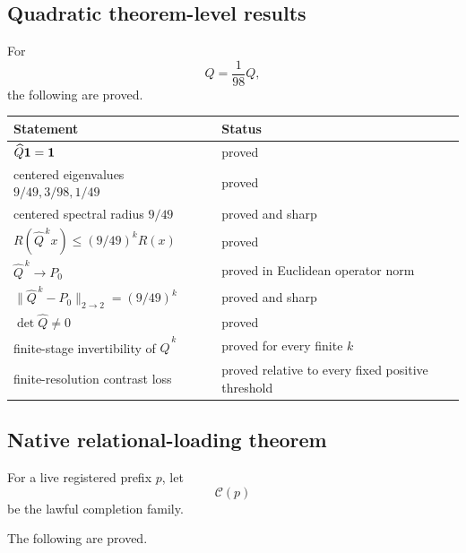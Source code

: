 \subsection{Quadratic theorem-level results}

For
\[
\widehat Q=\frac1{98}Q,
\]
the following are proved.

\begin{center}
\begin{tabular}{p{} p{}}
\toprule
Statement & Status\\
\midrule

\(\widehat Q\mathbf{1}=\mathbf{1}\) &
proved\\

centered eigenvalues
\(9/49,3/98,1/49\) &
proved\\

centered spectral radius \(9/49\) &
proved and sharp\\

\(
R(\widehat Q^{\,k}x)
\le
(9/49)^kR(x)
\) &
proved\\

\(\widehat Q^{\,k}\to P_0\) &
proved in Euclidean operator norm\\

\(
\|\widehat Q^{\,k}-P_0\|_{2\to2}
=
(9/49)^k
\) &
proved and sharp\\

\(\det\widehat Q\neq0\) &
proved\\

finite-stage invertibility of
\(\widehat Q^{\,k}\) &
proved for every finite \(k\)\\

finite-resolution contrast loss &
proved relative to every fixed positive threshold\\

\bottomrule
\end{tabular}
\end{center}

\subsection{Native relational-loading theorem}

For a live registered prefix \(p\), let
\[
\mathcal C(p)
\]
be the lawful completion family.

The following are proved.

